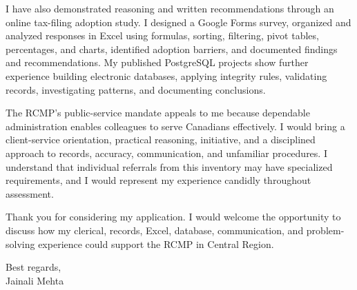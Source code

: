 \documentclass[letterpaper,11pt]{article}
\begin{document}
\bigbreak
I have also demonstrated reasoning and written recommendations through an online tax-filing adoption study. I designed a Google Forms survey, organized and analyzed responses in Excel using formulas, sorting, filtering, pivot tables, percentages, and charts, identified adoption barriers, and documented findings and recommendations. My published PostgreSQL projects show further experience building electronic databases, applying integrity rules, validating records, investigating patterns, and documenting conclusions.

\bigbreak
The RCMP's public-service mandate appeals to me because dependable administration enables colleagues to serve Canadians effectively. I would bring a client-service orientation, practical reasoning, initiative, and a disciplined approach to records, accuracy, communication, and unfamiliar procedures. I understand that individual referrals from this inventory may have specialized requirements, and I would represent my experience candidly throughout assessment.

\bigbreak
Thank you for considering my application. I would welcome the opportunity to discuss how my clerical, records, Excel, database, communication, and problem-solving experience could support the RCMP in Central Region.

\bigbreak
Best regards,\\
Jainali Mehta
\end{document}

